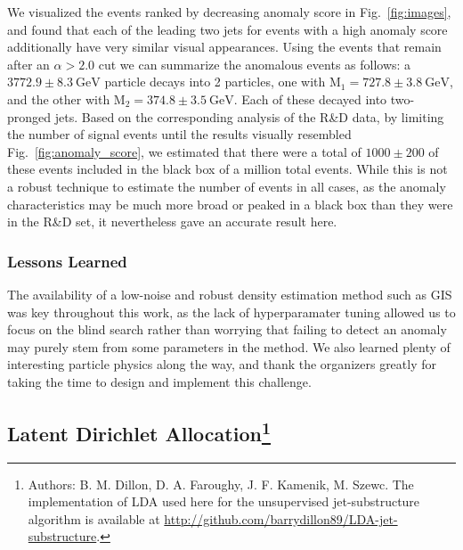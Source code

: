 \documentclass[a4paper,11pt]{article}
\begin{document}
We visualized the events ranked by decreasing anomaly score in Fig.~\ref{fig:images}, and found that each of the leading two jets for events with a high anomaly score additionally have very similar visual appearances. Using the events that remain after an $\alpha > 2.0$ cut we can summarize the anomalous events as follows: a $\mathrm{3772.9\pm 8.3\ GeV}$ particle decays into 2 particles, one with $\mathrm{M_{1}=727.8 \pm 3.8\ GeV}$, and the other with $\mathrm{M_2 = 374.8 \pm 3.5\ GeV}$. Each of these decayed into  two-pronged jets. Based on the corresponding analysis of the R\&D data, by limiting the number of signal events until the results visually resembled Fig.~\ref{fig:anomaly_score}, we estimated that there were a total of $1000\pm 200$ of these events included in the black box of a million total events. While this is not a robust technique to estimate the number of events in all cases, as the anomaly characteristics may be much more broad or peaked in a black box than they were in the R\&D set, it nevertheless gave an accurate result here.

\subsubsection{Lessons Learned}
\label{sec:lessons}
The availability of a low-noise and robust density estimation method such as GIS was key throughout this work, as the lack of hyperparamater tuning allowed us to focus on the blind search rather than worrying that failing to detect an anomaly may purely stem from some parameters in the method. We also learned plenty of interesting particle physics along the way, and thank the organizers greatly for taking the time to design and implement this challenge. 


 \FloatBarrier



\subsection[Latent Dirichlet Allocation]{Latent Dirichlet Allocation\footnote{Authors: B. M. Dillon, D. A. Faroughy, J. F. Kamenik, M. Szewc.  The implementation of LDA used here for the unsupervised jet-substructure algorithm is available at \url{http://github.com/barrydillon89/LDA-jet-substructure}. }}

\label{sec:lda}
\end{document}
